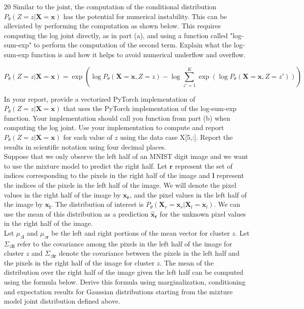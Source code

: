 \documentclass[11pt]{article}
\newcommand{\mbf}[1]{{\mathbf{#1}}}
\begin{document}
\begin{problem}{20}
 Similar to the joint, the computation of the conditional distribution $P_{\theta}(Z=z|\mbf{X}=\mbf{x})$ has the potential for numerical instability. This can be alleviated by performing the computation as shown below. This requires computing the log joint directly, as in part (a), and using a function called "log-sum-exp" to perform the computation of the second term. Explain what the log-sum-exp function is and how it helps to avoid numerical underflow and overflow.

$$P_{\theta}(Z=z|\mbf{X}=\mbf{x}) = \exp\left(\log P_{\theta}(\mbf{X}=\mbf{x},Z=z) - \log\sum_{z'=1}^K \exp(\log P_{\theta}(\mbf{X}=\mbf{x},Z=z'))\right)$$

 In your report, provide a vectorized PyTorch implementation of $P_{\theta}(Z=z|\mbf{X}=\mbf{x})$ that uses the PyTorch implementation of the log-sum-exp function. Your implementation should call you function from part (b) when computing the log joint. Use your implementation to compute and report $P_{\theta}(Z=z|\mbf{X}=\mbf{x})$ for each value of $z$ using the data case X[5,:]. Report the results in scientific notation using four decimal places.\\

 Suppose that we only observe the left half of an MNIST digit image and we want to use the mixture model to predict the right half. Let
$\mbf{r}$ represent the set of indices corresponding to the pixels in the right half of the image and $\mbf{l}$ represent the indices of the pixels in the left half of the image. We will denote the pixel values in the right half of the image by $\mbf{x_r}$, and the pixel values in the left half of the image by $\mbf{x_l}$. The distribution of interest is $P_{\theta}(\mbf{X}_r=\mbf{x}_r|\mbf{X}_l=\mbf{x}_l)$. We can use the mean of this distribution as a prediction $\hat{\mbf{x}}_{\mbf{r}}$ for the unknown pixel values in the right half of the image.\\

Let $\mu_{z\mbf{l}}$ and $\mu_{z\mbf{r}}$ be the left and right portions of the mean vector for cluster $z$. Let $\Sigma_{z\mbf{ll}}$ refer to the covariance among the pixels in the left half of the image for cluster $z$ and $\Sigma_{z\mbf{lr}}$ denote the covariance between the pixels in the left half and the pixels in the right half of the image for cluster $z$. The mean of the distribution over the right half of the image given the left half can be computed using the formula below. Derive this formula using marginalization, conditioning and expectation results for Gaussian distributions starting from the mixture model joint distribution defined above.


\end{problem}
\end{document}
